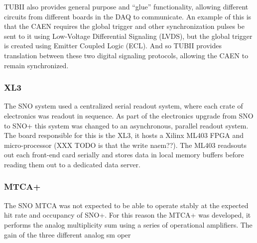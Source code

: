 TUBII also provides general purpose and ``glue'' functionality,
allowing different circuits from different boards in the DAQ to communicate.
An example of this is that the CAEN requires the global trigger and
other synchronization pulses be sent to it using Low-Voltage Differential
Signaling (LVDS), but the global trigger is created using Emitter Coupled
Logic (ECL).
And so TUBII provides translation between these two digital signaling protocols,
allowing the CAEN to remain synchronized.

\subsubsection{XL3}
The SNO system used a centralized serial readout system, where each crate of
electronics was readout in sequence.
As part of the electronics upgrade from SNO to SNO+ this system was changed to
an asynchronous, parallel readout system.
The board responsible for this is the XL3, it hosts a Xilinx ML403
FPGA and micro-processor (XXX TODO is that the write naem??).
The ML403 readsouts out each front-end card serially and stores data
in local memory buffers before reading them out to a dedicated
data server. 
\subsubsection{MTCA+}
The SNO MTCA was not expected to be able to operate stably at the expected
hit rate and occupancy of SNO+. For this reason the MTCA+ was developed,
it performs the analog multiplicity sum using a series of operational
amplifiers. The gain of the three different analog sm
oper
